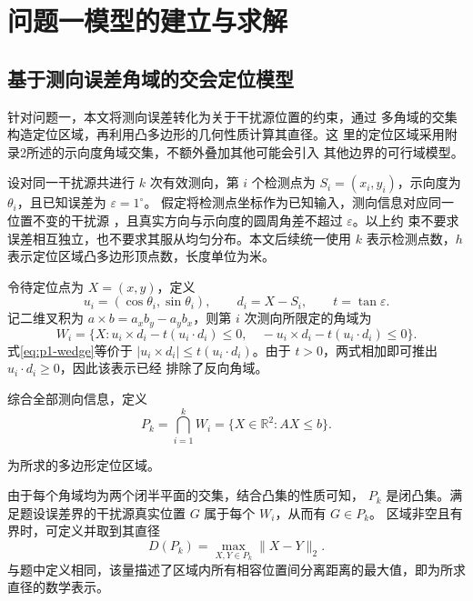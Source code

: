\documentclass[withoutpreface,bwprint]{cumcmthesis} %
\begin{document}
\section{问题一模型的建立与求解}

\subsection{基于测向误差角域的交会定位模型}

针对问题一，本文将测向误差转化为关于干扰源位置的约束，通过
多角域的交集构造定位区域，再利用凸多边形的几何性质计算其直径。这
里的定位区域采用附录2所述的示向度角域交集，不额外叠加其他可能会引入
其他边界的可行域模型。

设对同一干扰源共进行 $k$ 次有效测向，第 $i$ 个检测点为
$S_i=(x_i,y_i)$，示向度为 $\theta_i$，且已知误差为 $\varepsilon=1^\circ$。
假定将检测点坐标作为已知输入，测向信息对应同一位置不变的干扰源
，且真实方向与示向度的圆周角差不超过 $\varepsilon$。以上约
束不要求误差相互独立，也不要求其服从均匀分布。本文后续统一使用
$k$ 表示检测点数，$h$ 表示定位区域凸多边形顶点数，长度单位为米。

令待定位点为 $X=(x,y)$，定义
\begin{equation}
u_i=(\cos\theta_i,\sin\theta_i),\qquad d_i=X-S_i,\qquad t=\tan\varepsilon.
\end{equation}
记二维叉积为 $a\times b=a_xb_y-a_yb_x$，则第 $i$ 次测向所限定的角域为 
\begin{equation}\label{eq:p1-wedge}
W_i=\{X:u_i\times d_i-t(u_i\cdot d_i)\le0,\quad
-u_i\times d_i-t(u_i\cdot d_i)\le0\}.
\end{equation}
式\eqref{eq:p1-wedge}等价于 $|u_i\times d_i|\le t(u_i\cdot d_i)$。由于 $t>0$，两式相加即可推出 $u_i\cdot d_i\ge0$，因此该表示已经
排除了反向角域。

综合全部测向信息，定义
\begin{equation}\label{eq:p1-region}
P_k=\bigcap_{i=1}^{k}W_i=\{X\in\mathbb R^2:AX\le b\}.
\end{equation}

为所求的多边形定位区域。

由于每个角域均为两个闭半平面的交集，结合凸集的性质可知， $P_k$ 是闭凸集。满足题设误差界的干扰源真实位置 $G$ 属于每个 $W_i$，从而有 $G\in P_k$。
区域非空且有界时，可定义并取到其直径
\begin{equation}\label{eq:p1-diameter}
D(P_k)=\max_{X,Y\in P_k}\|X-Y\|_2.
\end{equation}
与题中定义相同，该量描述了区域内所有相容位置间分离距离的最大值，即为所求直径的数学表示。
\end{document}
